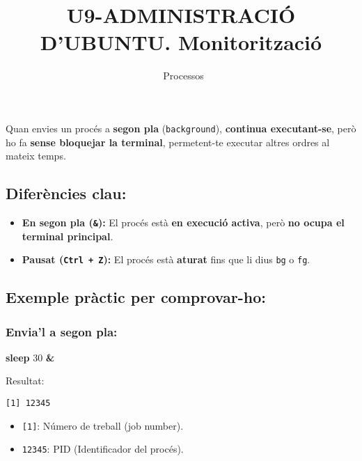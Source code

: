 \documentclass[
  12 pt,
  a4paper,
]{article}
\title{U9-ADMINISTRACIÓ D'UBUNTU. Monitorització}
\subtitle{~Processos}
\author{}
\date{\vspace{-2.5em}}
\newenvironment{Shaded}{\begin{snugshade}}{\end{snugshade}}
\newcommand{\FunctionTok}[1]{\textcolor[rgb]{0.13,0.29,0.53}{\textbf{#1}}}
\newcommand{\KeywordTok}[1]{\textcolor[rgb]{0.13,0.29,0.53}{\textbf{#1}}}
\newcommand{\NormalTok}[1]{#1}
\providecommand{\tightlist}{%
  \setlength{\itemsep}{0pt}\setlength{\parskip}{0pt}}
\begin{document}
\maketitle

Quan envies un procés a \textbf{segon pla} (\texttt{background}),
\textbf{continua executant-se}, però ho fa \textbf{sense bloquejar la
terminal}, permetent-te executar altres ordres al mateix temps.

\subsection{Diferències clau:}\label{diferuxe8ncies-clau}

\begin{itemize}
\tightlist
\item
  \textbf{En segon pla (\texttt{\&}):} El procés està \textbf{en
  execució activa}, però \textbf{no ocupa el terminal principal}.\\
\item
  \textbf{Pausat (\texttt{Ctrl\ +\ Z}):} El procés està \textbf{aturat}
  fins que li dius \texttt{bg} o \texttt{fg}.
\end{itemize}

\subsection{Exemple pràctic per
comprovar-ho:}\label{exemple-pruxe0ctic-per-comprovar-ho}

\subsubsection{Envia'l a segon pla:}\label{envial-a-segon-pla}

\begin{Shaded}
\begin{Highlighting}[]
\FunctionTok{sleep}\NormalTok{ 30 }\KeywordTok{\&}
\end{Highlighting}
\end{Shaded}

Resultat:

\begin{verbatim}
[1] 12345
\end{verbatim}

\begin{itemize}
\tightlist
\item
  \texttt{{[}1{]}}: Número de treball (job number).\\
\item
  \texttt{12345}: PID (Identificador del procés).
\end{itemize}
\end{document}
